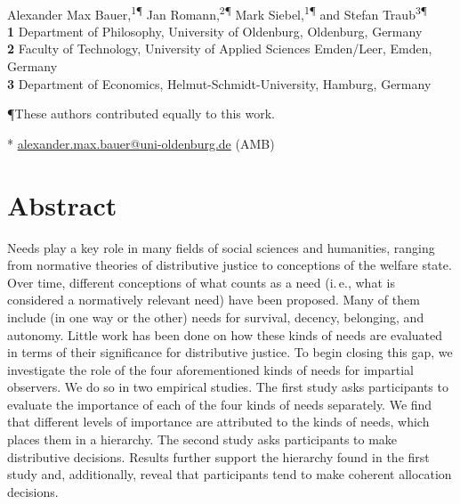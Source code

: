 \documentclass[10pt,letterpaper]{article}
\begin{document}
\vspace*{0.2in}


\begin{flushleft}
{\Large
\textbf{}
}
\newline
\\
Alexander Max Bauer,\textsuperscript{1\P*}
Jan Romann,\textsuperscript{2\P}
Mark Siebel,\textsuperscript{1\P}
and Stefan Traub\textsuperscript{3\P}
\\
\bigskip
\textbf{1} Department of Philosophy, University of Oldenburg, Oldenburg, Germany
\\
\textbf{2} Faculty of Technology, University of Applied Sciences Emden/Leer, Emden, Germany
\\
\textbf{3} Department of Economics, Helmut-Schmidt-University, Hamburg, Germany
\\
\bigskip

\P These authors contributed equally to this work.

* \href{mailto:alexander.max.bauer@uni-oldenburg.de}{alexander.max.bauer@uni-oldenburg.de} (AMB)
\end{flushleft}


\section*{Abstract}
Needs play a key role in many fields of social sciences and humanities, ranging from normative theories of distributive justice to conceptions of the welfare state.
Over time, different conceptions of what counts as a need (i.\,e., what is considered a normatively relevant need) have been proposed.
Many of them include (in one way or the other) needs for survival, decency, belonging, and autonomy.
Little work has been done on how these kinds of needs are evaluated in terms of their significance for distributive justice.
To begin closing this gap, we investigate the role of the four aforementioned kinds of needs for impartial observers.
We do so in two empirical studies.
The first study asks participants to evaluate the importance of each of the four kinds of needs separately.
We find that different levels of importance are attributed to the kinds of needs, which places them in a hierarchy.
The second study asks participants to make distributive decisions.
Results further support the hierarchy found in the first study and, additionally, reveal that participants tend to make coherent allocation decisions.
\end{document}
